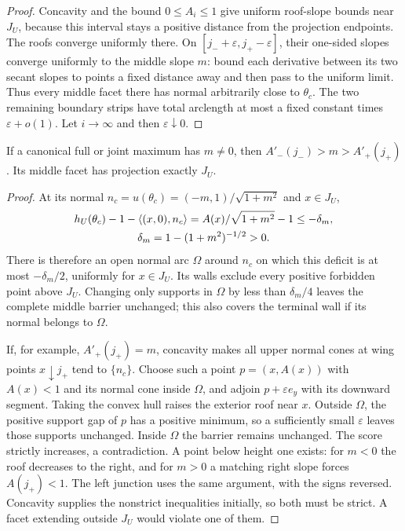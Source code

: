 \begin{proof}
Concavity and the bound $0\le A_i\le1$ give uniform roof-slope
bounds near $J_U$, because this interval stays a positive distance
from the projection endpoints. The roofs converge uniformly there.
On $[j_-+\varepsilon,j_+-\varepsilon]$, their one-sided slopes
converge uniformly to the middle slope $m$: bound each derivative
between its two secant slopes to points a fixed distance away and
then pass to the uniform limit. Thus every middle facet there has
normal arbitrarily close to $\theta_c$. The two remaining boundary
strips have total arclength at most a fixed constant times
$\varepsilon+o(1)$. Let $i\to\infty$ and then
$\varepsilon\downarrow0$.
\end{proof}

\begin{lemma}\label{lem:variation-middle-junctions}
If a canonical full or joint maximum has $m\ne0$, then
$A'_-(j_-)>m>A'_+(j_+)$. Its middle facet has projection exactly $J_U$.
\end{lemma}

\begin{proof}
At its normal $n_c=u(\theta_c)=(-m,1)/\sqrt{1+m^2}$ and $x\in J_U$,
\[
 \begin{gathered}
 h_U(\theta_c)-1-\langle (x,0),n_c\rangle
 =A(x)/\sqrt{1+m^2}-1\le-\delta_m,\\
 \delta_m=1-(1+m^2)^{-1/2}>0.
 \end{gathered}
\]
There is therefore an open normal arc $\Omega$ around $n_c$ on
which this deficit is at most $-\delta_m/2$, uniformly for $x\in J_U$.
Its walls exclude every positive forbidden point above $J_U$.
Changing only supports in $\Omega$ by less than $\delta_m/4$
leaves the complete middle barrier unchanged; this also covers
the terminal wall if its normal belongs to $\Omega$.

If, for example, $A'_+(j_+)=m$, concavity makes all upper normal
cones at wing points $x\downarrow j_+$ tend to $\{n_c\}$.
Choose such a point $p=(x,A(x))$ with $A(x)<1$ and its normal cone
inside $\Omega$, and adjoin $p+\varepsilon e_y$ with its downward
segment. Taking the convex hull raises the exterior roof near $x$.
Outside $\Omega$, the positive support gap of $p$ has a positive
minimum, so a sufficiently small $\varepsilon$ leaves those
supports unchanged. Inside $\Omega$ the barrier remains unchanged.
The score strictly increases, a contradiction. A point below height
one exists: for $m<0$ the roof decreases to the right, and for
$m>0$ a matching right slope forces $A(j_+)<1$.
The left junction uses the same argument, with the signs reversed.
Concavity supplies the nonstrict inequalities initially, so both
must be strict. A facet extending outside $J_U$ would violate one
of them.
\end{proof}

